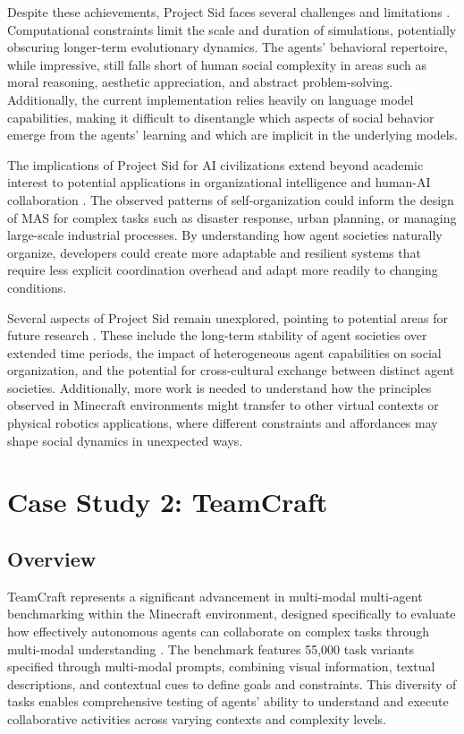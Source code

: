 \documentclass[a4paper, 12pt]{article}
\begin{document}
Despite these achievements, Project Sid faces several challenges and limitations \autocite{al2024projectsidmanyagentsimulations}. Computational constraints limit the scale and duration of simulations, potentially obscuring longer-term evolutionary dynamics. The agents' behavioral repertoire, while impressive, still falls short of human social complexity in areas such as moral reasoning, aesthetic appreciation, and abstract problem-solving. Additionally, the current implementation relies heavily on language model capabilities, making it difficult to disentangle which aspects of social behavior emerge from the agents' learning and which are implicit in the underlying models.

The implications of Project Sid for AI civilizations extend beyond academic interest to potential applications in organizational intelligence and human-AI collaboration \autocite{al2024projectsidmanyagentsimulations}. The observed patterns of self-organization could inform the design of MAS for complex tasks such as disaster response, urban planning, or managing large-scale industrial processes. By understanding how agent societies naturally organize, developers could create more adaptable and resilient systems that require less explicit coordination overhead and adapt more readily to changing conditions.

Several aspects of Project Sid remain unexplored, pointing to potential areas for future research \autocite{al2024projectsidmanyagentsimulations}. These include the long-term stability of agent societies over extended time periods, the impact of heterogeneous agent capabilities on social organization, and the potential for cross-cultural exchange between distinct agent societies. Additionally, more work is needed to understand how the principles observed in Minecraft environments might transfer to other virtual contexts or physical robotics applications, where different constraints and affordances may shape social dynamics in unexpected ways.

\section{Case Study 2: TeamCraft}

\subsection{Overview}

TeamCraft represents a significant advancement in multi-modal multi-agent benchmarking within the Minecraft environment, designed specifically to evaluate how effectively autonomous agents can collaborate on complex tasks through multi-modal understanding \autocite{long2024teamcraftbenchmarkmultimodalmultiagent}. The benchmark features 55,000 task variants specified through multi-modal prompts, combining visual information, textual descriptions, and contextual cues to define goals and constraints. This diversity of tasks enables comprehensive testing of agents' ability to understand and execute collaborative activities across varying contexts and complexity levels.
\end{document}

